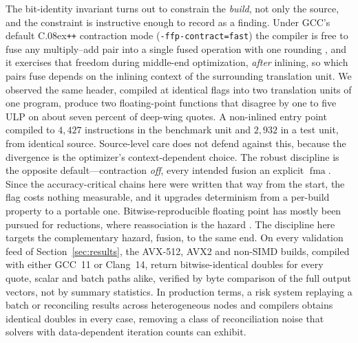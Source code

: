\documentclass[11pt]{article}
\begin{document}
The bit-identity invariant turns out to constrain the \emph{build}, not only the source, and the constraint is instructive enough to record as a finding. Under GCC's default C\raise.08ex\hbox{\tt ++} contraction mode (\texttt{-ffp-contract=fast}) the compiler is free to fuse any multiply--add pair into a single fused operation with one rounding \citep{ieee754_2019,muller2018handbook,goldberg1991floating}, and it exercises that freedom during middle-end optimization, \emph{after} inlining, so which pairs fuse depends on the inlining context of the surrounding translation unit. We observed the same header, compiled at identical flags into two translation units of one program, produce two floating-point functions that disagree by one to five ULP on about seven percent of deep-wing quotes. A non-inlined entry point compiled to $4{,}427$ instructions in the benchmark unit and $2{,}932$ in a test unit, from identical source. Source-level care does not defend against this, because the divergence is the optimizer's context-dependent choice. The robust discipline is the opposite default---contraction \emph{off}, every intended fusion an explicit $\operatorname{fma}$. Since the accuracy-critical chains here were written that way from the start, the flag costs nothing measurable, and it upgrades determinism from a per-build property to a portable one. Bitwise-reproducible floating point has mostly been pursued for reductions, where reassociation is the hazard \citep{demmel2015reproducible}. The discipline here targets the complementary hazard, fusion, to the same end. On every validation feed of Section~\ref{sec:results}, the AVX-512, AVX2 and non-SIMD builds, compiled with either GCC~11 or Clang~14, return bitwise-identical doubles for every quote, scalar and batch paths alike, verified by byte comparison of the full output vectors, not by summary statistics. In production terms, a risk system replaying a batch or reconciling results across heterogeneous nodes and compilers obtains identical doubles in every case, removing a class of reconciliation noise that solvers with data-dependent iteration counts can exhibit.
\end{document}
